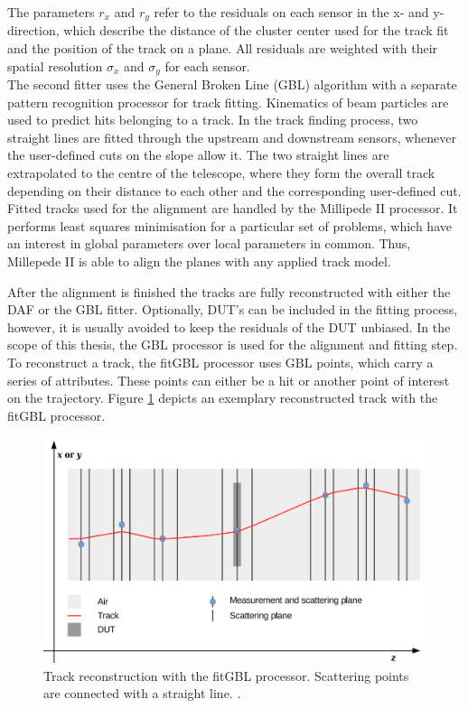 The parameters $r_x$ and $r_y$ refer to the residuals on each sensor in the x- and y-direction, which describe the distance of the cluster center used for the track fit and the
position of the track on a plane. All residuals are weighted with their spatial resolution $\sigma_x$ and $\sigma_y$ for each sensor. \\
The second fitter uses the General Broken Line (GBL) algorithm with a separate pattern recognition processor for track fitting. Kinematics of
beam particles are used to predict hits belonging to a track. In the track finding process, two straight lines are fitted through the upstream and
downstream sensors, whenever the user-defined cuts on the slope allow it. The two straight lines are extrapolated to the centre of the telescope, where
they form the overall track depending on their distance to each other and the corresponding user-defined cut.\\
Fitted tracks used for the alignment are handled by the Millipede II processor. It performs least squares minimisation for a particular set of problems, which
have an interest in global parameters over local parameters in common. Thus, Millepede II is able to align the planes with any applied track model.

After the alignment is finished the tracks are fully reconstructed with either the DAF or the GBL fitter. Optionally, DUT's can be included in the fitting
process, however, it is usually avoided to keep the residuals of the DUT unbiased. In the scope of this thesis, the GBL processor is used for the
alignment and fitting step. To reconstruct a track, the fitGBL processor uses GBL points, which carry a series of attributes. These points can either be a
hit or another point of interest on the trajectory. Figure \ref{fig:gbl} depicts an exemplary reconstructed track with the fitGBL processor.

\begin{figure}
  \centering
  \includegraphics[height=0.5\textwidth]{images/gbl.png}
  \caption{Track reconstruction with the fitGBL processor. Scattering points are connected with a straight line. \cite{gbl}.}
  \label{fig:gbl}
\end{figure}




